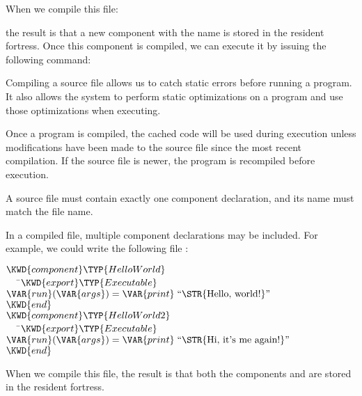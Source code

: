 \begin{itemize}
When we compile this file:


the result is that a new component with the name  is stored
in the resident fortress.
Once this component is compiled,
we can execute it by issuing
the following command:


Compiling a source file allows us to catch static errors before running a program.
It also allows the system to perform static optimizations on a program and use those
optimizations when executing.

Once a program is compiled, the cached code will be used during execution unless
modifications have been made to the source file since the most recent compilation.
If the source file is newer, the program is recompiled before execution.

\end{itemize}

A source file must contain exactly one component declaration, and its name must
match the file name.

In a compiled file,
multiple component declarations may be included.
For example, we could write the following file
:

%
\begin{Fortress}
\(\KWD{component} \TYP{HelloWorld}\)\\
{\tt~~~}\pushtabs\=\+\(   \KWD{export} \TYP{Executable}\)\\
\(   \VAR{run}(\VAR{args}) = \VAR{print}\;\hbox{\rm``\STR{Hello,~world!}''}\)\-\\\poptabs
\(\KWD{end}\)\\[4pt]
\(\KWD{component} \TYP{HelloWorld2}\)\\
{\tt~~~}\pushtabs\=\+\(   \KWD{export} \TYP{Executable}\)\\
\(   \VAR{run}(\VAR{args}) = \VAR{print}\;\hbox{\rm``\STR{Hi,~it's~me~again!}''}\)\-\\\poptabs
\(\KWD{end}\)
\end{Fortress}

When we compile this file, the result is that both the components
 and  are stored in the resident fortress.

